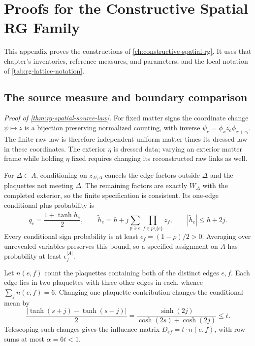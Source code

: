 \chapter{Proofs for the Constructive Spatial RG Family}
\label{app:spatial-rg-proofs}

This appendix proves the constructions of \cref{ch:constructive-spatial-rg}.
It uses that chapter's inventories, reference measures, and parameters, and
the local notation of \cref{tab:rg-lattice-notation}.

\section{The source measure and boundary comparison}
\label{sec:rg-spatial-proof-measure}

\noindent\emph{Proof of \cref{thm:rg-spatial-source-law}.}
For fixed matter signs the coordinate change \(\psi\mapsto z\) is a
bijection preserving normalized counting, with inverse
\(\psi_e=\phi_xz_e\phi_{x+e_\iota}\). The finite raw law is therefore
independent uniform matter times its dressed law in these coordinates. The
exterior \(\eta\) is dressed data; varying an exterior matter frame while
holding \(\eta\) fixed requires changing its reconstructed raw links as
well.

For \(\Delta\subset\Lambda\), conditioning on \(z_{\Lambda\setminus\Delta}\)
cancels the edge factors outside \(\Delta\) and the plaquettes not meeting
\(\Delta\). The remaining factors are exactly \(W_\Delta\) with the
completed exterior, so the finite specification is consistent. Its one-edge
conditional plus probability is
\begin{equation}
 q_e=\frac{1+\tanh\widetilde h_e}{2},\qquad
 \widetilde h_e=h+j\sum_{p\ni e}\prod_{f\in p\setminus\{e\}}z_f,
 \qquad |\widetilde h_e|\le h+2j.
 \label{eq:rg-spatial-proof-single-row}
\end{equation}
Every conditional sign probability is at least \(\epsilon_f=(1-\rho)/2>0\).
Averaging over unrevealed variables preserves this bound, so a specified
assignment on \(A\) has probability at least \(\epsilon_f^{|A|}\).

Let \(n(e,f)\) count the plaquettes containing both of the distinct edges
\(e,f\). Each edge lies in two plaquettes with three other edges in each,
whence \(\sum_fn(e,f)=6\). Changing one plaquette contribution changes the
conditional mean by
\begin{equation}
 \frac{|\tanh(s+j)-\tanh(s-j)|}{2}
 =\frac{\sinh(2j)}{\cosh(2s)+\cosh(2j)}\le t.
 \label{eq:rg-spatial-proof-influence}
\end{equation}
Telescoping such changes gives the influence matrix \(D_{ef}=t\cdot n(e,f)\),
with row sums at most \(\alpha=6t<1\).

